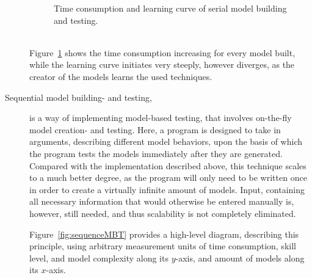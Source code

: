 \begin{description}
\begin{figure}[h]
    \caption{Time consumption and learning curve of serial model building and testing.}
    \label{fig:serialMBT}
  \end{figure}\ \\
  Figure~\ref{fig:serialMBT} shows the time consumption increasing for every model built, while the learning curve initiates very steeply, however diverges, as the creator of the models learns the used techniques. 
  \item[Sequential model building- and testing,]
  is a way of implementing model-based testing, that involves on-the-fly model creation- and testing. Here, a program is designed to take in arguments, describing different model behaviors, upon the basis of which the program tests the models immediately after they are generated. Compared with the implementation described above, this technique scales to a much better degree, as the program will only need to be written once in order to create a virtually infinite amount of models. 
  Input, containing all necessary information that would otherwise be entered manually is, however, still needed, and thus scalability is not completely eliminated. 

  Figure~\ref{fig:sequenceMBT} provides a high-level diagram, describing this principle, using arbitrary measurement units of time consumption, skill level, and model complexity along its $y$-axis, and amount of models along its $x$-axis.
  \begin{figure}[h]
    \centering
\end{figure}
\end{description}
